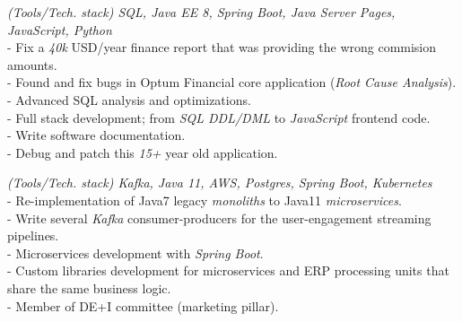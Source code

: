 \documentclass[]{CV-JuanCamiloFlorez}
\begin{document}
\begin{minipage}[t]{0.66\textwidth}
    \noindent
    \textit{(Tools/Tech. stack) SQL, Java EE 8, Spring Boot, Java Server Pages, JavaScript, Python} \\
        - Fix a \textit{40k} USD/year finance report that was providing the wrong commision amounts. \\
        - Found and fix bugs in Optum Financial core application (\textit{Root Cause Analysis}). \\
        - Advanced SQL analysis and optimizations. \\
        - Full stack development; from \textit{SQL DDL/DML} to \textit{JavaScript} frontend code. \\
        - Write software documentation. \\
        - Debug and patch this \textit{15+} year old application. \\
        \sectionsep

    \noindent
    \textit{(Tools/Tech. stack) Kafka, Java 11, AWS, Postgres, Spring Boot, Kubernetes} \\
        - Re-implementation of Java7 legacy \textit{monoliths} to Java11 \textit{microservices}. \\
        - Write several \textit{Kafka} consumer-producers for the user-engagement streaming pipelines. \\
        - Microservices development with \textit{Spring Boot}. \\
        - Custom libraries development for microservices and ERP processing units that share the same business logic. \\
        - Member of DE+I committee (marketing pillar). \\
        \sectionsep


\end{minipage}
\end{document}
